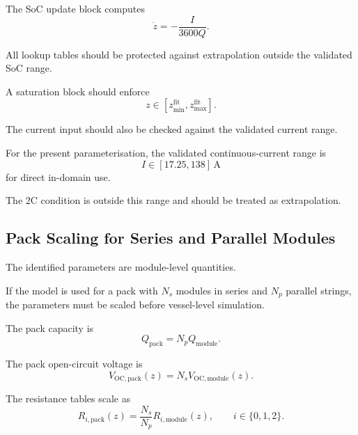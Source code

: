 \documentclass[a4paper,12pt]{article}
\begin{document}
The SoC update block computes
\begin{equation}
\dot{z}
=
-\frac{I}{3600Q}.
\label{eq:exec_simulink_soc}
\end{equation}

All lookup tables should be protected against extrapolation outside the validated SoC range.

A saturation block should enforce
\begin{equation}
z\in[z_{\min}^{\mathrm{fit}},z_{\max}^{\mathrm{fit}}].
\label{eq:exec_simulink_soc_saturation}
\end{equation}

The current input should also be checked against the validated current range.

For the present parameterisation, the validated continuous-current range is
\begin{equation}
I\in[17.25,138]\,\mathrm{A}
\label{eq:exec_validated_current_range}
\end{equation}
for direct in-domain use.

The 2C condition is outside this range and should be treated as extrapolation.

\subsection{Pack Scaling for Series and Parallel Modules}

The identified parameters are module-level quantities.

If the model is used for a pack with \(N_s\) modules in series and \(N_p\) parallel strings, the parameters must be scaled before vessel-level simulation.

The pack capacity is
\begin{equation}
Q_{\mathrm{pack}}
=
N_p Q_{\mathrm{module}}.
\label{eq:exec_pack_capacity}
\end{equation}

The pack open-circuit voltage is
\begin{equation}
V_{\mathrm{OC,pack}}(z)
=
N_s V_{\mathrm{OC,module}}(z).
\label{eq:exec_pack_ocv}
\end{equation}

The resistance tables scale as
\begin{equation}
R_{i,\mathrm{pack}}(z)
=
\frac{N_s}{N_p}
R_{i,\mathrm{module}}(z),
\qquad
i\in\{0,1,2\}.
\label{eq:exec_pack_resistances}
\end{equation}
\end{document}
